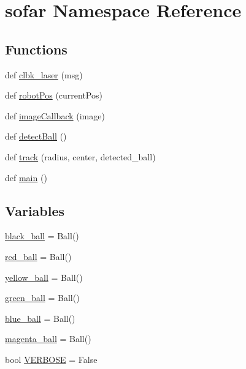 \hypertarget{namespacesofar}{}\section{sofar Namespace Reference}
\label{namespacesofar}
\subsection*{Functions}
\begin{DoxyCompactItemize}
\item 
def \hyperlink{namespacesofar_a825650ee1ca10b1211d10f7129f71d7c}{clbk\+\_\+laser} (msg)
\item 
def \hyperlink{namespacesofar_aa6fd2d163a1a1c29d8298f0df2004607}{robot\+Pos} (current\+Pos)
\item 
def \hyperlink{namespacesofar_ad92d3e60778d7b31fa72a235856fb583}{image\+Callback} (image)
\item 
def \hyperlink{namespacesofar_ab7831b2945a1bd5fb2868bfb1a9a1119}{detect\+Ball} ()
\item 
def \hyperlink{namespacesofar_afc2980d2494d4c3237555ed677620318}{track} (radius, center, detected\+\_\+ball)
\item 
def \hyperlink{namespacesofar_ab35e3b9e08ad442b61908f372cfa2cdf}{main} ()
\end{DoxyCompactItemize}
\subsection*{Variables}
\begin{DoxyCompactItemize}
\item 
\hyperlink{namespacesofar_a2428f1093186867d48b4347c3ca7e309}{black\+\_\+ball} = Ball()
\item 
\hyperlink{namespacesofar_ad90dd34175ed33940dd36296cf282311}{red\+\_\+ball} = Ball()
\item 
\hyperlink{namespacesofar_a503bd531a472fdac873e762ac7d4cafe}{yellow\+\_\+ball} = Ball()
\item 
\hyperlink{namespacesofar_afc01234c38100dadc0f39a7b337a1f07}{green\+\_\+ball} = Ball()
\item 
\hyperlink{namespacesofar_a71e03d466d0c78fd44668097cc2a933a}{blue\+\_\+ball} = Ball()
\item 
\hyperlink{namespacesofar_a91e20c53c4643e89b91d7fc7b8607af8}{magenta\+\_\+ball} = Ball()
\item 
bool \hyperlink{namespacesofar_a29c2c8f3492c5ba12caac7f042930a8a}{V\+E\+R\+B\+O\+SE} = False
\end{DoxyCompactItemize}


